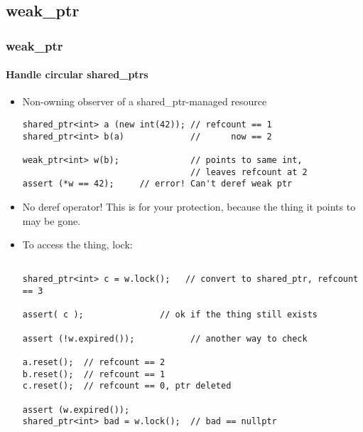 


\subsection{weak\_ptr}
\begin{frame}[fragile]
\frametitle{weak\_ptr}
\framesubtitle{Handle circular shared\_ptrs}

\begin{itemize}
\item Non-owning observer of a shared\_ptr-managed resource
{\scriptsize\begin{verbatim}
shared_ptr<int> a (new int(42)); // refcount == 1
shared_ptr<int> b(a)             //      now == 2

weak_ptr<int> w(b);              // points to same int,
                                 // leaves refcount at 2
assert (*w == 42);     // error! Can't deref weak ptr
\end{verbatim}
}
\pause{}
\item No deref operator!  This is for your protection, because the
  thing it points to may be gone.
\pause{}
\item To access the thing, lock:
{\scriptsize\begin{verbatim}

shared_ptr<int> c = w.lock();   // convert to shared_ptr, refcount == 3

assert( c );               // ok if the thing still exists

assert (!w.expired());           // another way to check

a.reset();  // refcount == 2
b.reset();  // refcount == 1
c.reset();  // refcount == 0, ptr deleted

assert (w.expired());
shared_ptr<int> bad = w.lock();  // bad == nullptr
\end{verbatim} 
}
\end{itemize}
\end{frame}

